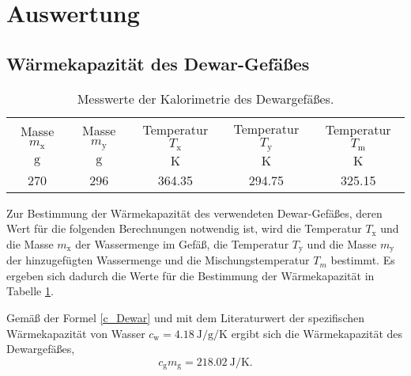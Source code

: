 \section{Auswertung}
\label{sec:Auswertung}
\subsection{Wärmekapazität des Dewar-Gefäßes}
\begin{table}[ht]
	\centering
	\begin{tabular}{ccccc}%
		\toprule
		{Masse $m_\text{x}$}& {Masse $m_\text{y}$}  &{Temperatur  $T_\text{x}$}&{Temperatur $T_\text{y}$}  &{Temperatur $T_\text{m}$}\\
		{$\si{\gram}$}& {$\si{\gram}$}  &{$\si{\kelvin}$}& {$\si{\kelvin}$}  &{$\si{\kelvin}$}\\
		\midrule
		270 & 296 & 364.35 & 294.75 & 325.15\\
		\bottomrule
	\end{tabular}
	\caption{Messwerte der Kalorimetrie des Dewargefäßes.}
	\label{tab:messung1}
\end{table}
Zur Bestimmung der Wärmekapazität des verwendeten Dewar-Gefäßes, deren Wert für die folgenden Berechnungen notwendig ist,
wird die Temperatur $T_\text{x}$ und die Masse $m_\text{x}$ der Wassermenge im Gefäß, die Temperatur $T_\text{y}$ und die Masse $m_\text{y}$ der hinzugefügten Wassermenge und die Mischungstemperatur $T_m$ bestimmt.
Es ergeben sich dadurch die Werte für die Bestimmung der Wärmekapazität in Tabelle \ref{tab:messung1}.

Gemäß der Formel \eqref{c_Dewar} und mit dem Literaturwert der spezifischen Wärmekapazität von Wasser
$c_\text{w}=\SI{4.18}{\joule\per\gram\per\kelvin}$\cite{V201} ergibt sich die Wärmekapazität des Dewargefäßes,
\begin{equation}
	c_\mathup{g}m_\mathup{g}=\SI{218.02}{\joule\per\kelvin}.
	\label{wert:waerme_dewar}
\end{equation}

